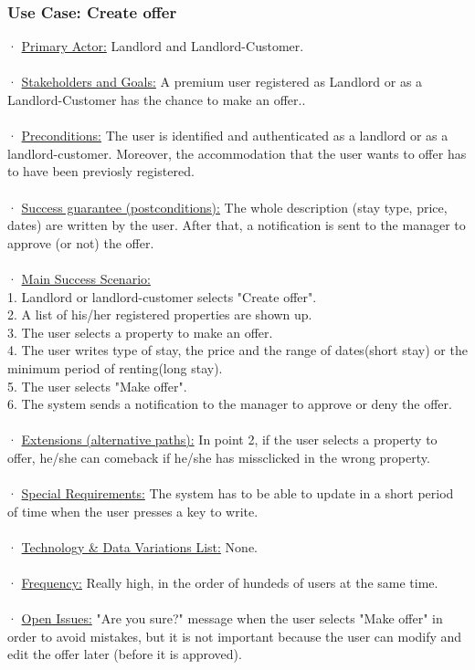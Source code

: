 \documentclass[12pt]{article}
\begin{document}
{\subsubsection{Use Case: Create offer}
· \underline{Primary Actor:} Landlord and Landlord-Customer.\\\\
· \underline{Stakeholders and Goals:} A premium user registered as Landlord or as a Landlord-Customer has the chance to make an offer..\\\\
· \underline{Preconditions:} The user is identified and authenticated as a landlord or as a landlord-customer. Moreover, the accommodation that the user wants to offer has to have been previosly registered.\\\\
· \underline{Success guarantee (postconditions):} The whole description (stay type, price, dates) are written by the user. After that, a notification is sent to the manager to approve (or not) the offer.\\\\
· \underline{Main Success Scenario:}\\
	1. Landlord or landlord-customer selects "Create offer".\\
	2. A list of his/her registered properties are shown up.\\
	3. The user selects a property to make an offer.\\
	4. The user writes type of stay, the price and the range of dates(short stay) or the minimum period of renting(long stay).\\
	5. The user selects "Make offer".\\
	6. The system sends a notification to the manager to approve or deny the offer.\\\\
· \underline{Extensions (alternative paths):} In point 2, if the user selects a property to offer, he/she can comeback if he/she has missclicked in the wrong property.\\\\
· \underline{Special Requirements:} The system has to be able to update in a short period of time when the user presses a key to write. \\\\
· \underline{Technology \& Data Variations List:} None.\\\\
· \underline{Frequency:} Really high, in the order of hundeds of users at the same time.\\\\
· \underline{Open Issues:} "Are you sure?" message when the user selects "Make offer" in order to avoid mistakes, but it is not important because the user can modify and edit the offer later (before it is approved).\\

}
\end{document}
